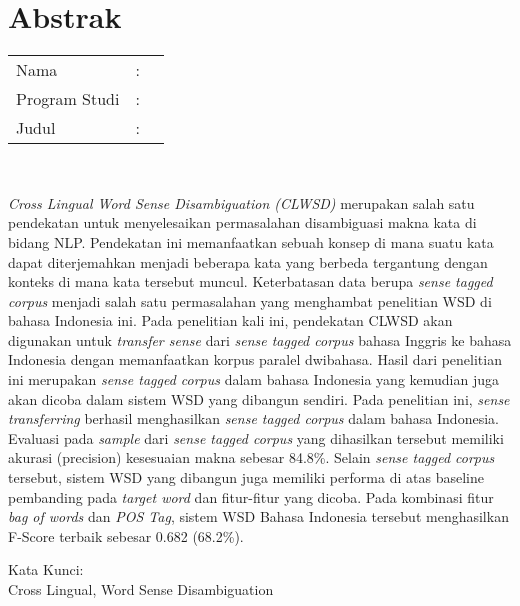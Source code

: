 %
%
%

\chapter*{Abstrak}

\vspace*{0.2cm}

\noindent \begin{tabular}{l l p{10cm}}
	Nama&: & \penulis \\
	Program Studi&: & \program \\
	Judul&: & \judul \\
\end{tabular} \\ 

\vspace*{0.5cm}

\noindent
\textit{Cross Lingual Word Sense Disambiguation (CLWSD)} merupakan salah satu pendekatan untuk menyelesaikan permasalahan disambiguasi makna kata di bidang NLP. Pendekatan ini memanfaatkan sebuah konsep di mana suatu kata dapat diterjemahkan menjadi beberapa kata yang berbeda tergantung dengan konteks di mana kata tersebut muncul. Keterbatasan data berupa \textit{sense tagged corpus} menjadi salah satu permasalahan yang menghambat penelitian WSD di bahasa Indonesia ini. Pada penelitian kali ini, pendekatan CLWSD akan digunakan untuk \textit{transfer sense} dari \textit{sense tagged corpus} bahasa Inggris ke bahasa Indonesia dengan memanfaatkan korpus paralel dwibahasa. Hasil dari penelitian ini merupakan \textit{sense tagged corpus} dalam bahasa Indonesia yang kemudian juga akan dicoba dalam sistem WSD yang dibangun sendiri. Pada penelitian ini, \textit{sense transferring} berhasil menghasilkan \textit{sense tagged corpus} dalam bahasa Indonesia. Evaluasi pada \textit{sample} dari \textit{sense tagged corpus} yang dihasilkan tersebut memiliki akurasi (precision) kesesuaian makna sebesar 84.8\%. Selain \textit{sense tagged corpus} tersebut, sistem WSD yang dibangun juga memiliki performa di atas baseline pembanding pada \textit{target word} dan fitur-fitur yang dicoba. Pada kombinasi fitur \textit{bag of words} dan \textit{POS Tag}, sistem WSD Bahasa Indonesia tersebut menghasilkan F-Score terbaik sebesar 0.682 (68.2\%).


\vspace*{0.2cm}

\noindent Kata Kunci: \\ 
\noindent Cross Lingual, Word Sense Disambiguation

\newpage